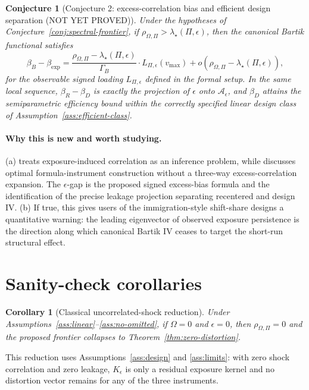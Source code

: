 \documentclass[11pt]{article}
\theoremstyle{definition}
\theoremstyle{plain}
\newtheorem{conjecture}{Conjecture}
\newtheorem{corollary}{Corollary}
\theoremstyle{remark}
\begin{document}
\begin{conjecture}[Conjecture 2: excess-correlation bias and efficient design separation (NOT YET PROVED)]\label{conj:strict-separation}
Under the hypotheses of Conjecture~\ref{conj:spectral-frontier}, if $\rho_{\Omega,\Pi}>\lambda_\star(\Pi,\epsilon)$, then the canonical Bartik functional satisfies
\[
\beta_B-\beta_{\exp}
=\frac{\rho_{\Omega,\Pi}-\lambda_\star(\Pi,\epsilon)}{\Gamma_B}
\cdot L_{\Pi,\epsilon}(v_{\max})+o(\rho_{\Omega,\Pi}-\lambda_\star(\Pi,\epsilon)),
\]
for the observable signed loading $L_{\Pi,\epsilon}$ defined in the formal setup.  In the same local sequence, $\beta_R-\beta_D$ is exactly the projection of $\epsilon$ onto $\mathcal A_\epsilon$, and $\beta_D$ attains the semiparametric efficiency bound within the correctly specified linear design class of Assumption~\ref{ass:efficient-class}.
\end{conjecture}
\paragraph{Why this is new and worth studying.}
(a) \citet{AdaoKolesarMorales2019QJE} treats exposure-induced correlation as an inference problem, while \citet{BorusyakHullJaravel2025ECTJ} discusses optimal formula-instrument construction without a three-way excess-correlation expansion.  The $\epsilon$-gap is the proposed signed excess-bias formula and the identification of the precise leakage projection separating recentered and design IV.  (b) If true, this gives users of the \citet{JaegerRuistStuhler2018NBER} immigration-style shift-share designs a quantitative warning: the leading eigenvector of observed exposure persistence is the direction along which canonical Bartik IV ceases to target the short-run structural effect.

\section{Sanity-check corollaries}
\begin{corollary}[Classical uncorrelated-shock reduction]\label{cor:bhj}
Under Assumptions~\ref{ass:linear}--\ref{ass:no-omitted}, if $\Omega=0$ and $\epsilon=0$, then $\rho_{\Omega,\Pi}=0$ and the proposed frontier collapses to Theorem~\ref{thm:zero-distortion}.
\end{corollary}
This reduction uses Assumptions~\ref{ass:design} and \ref{ass:limits}: with zero shock correlation and zero leakage, $K_\epsilon$ is only a residual exposure kernel and no distortion vector remains for any of the three instruments.
\end{document}
